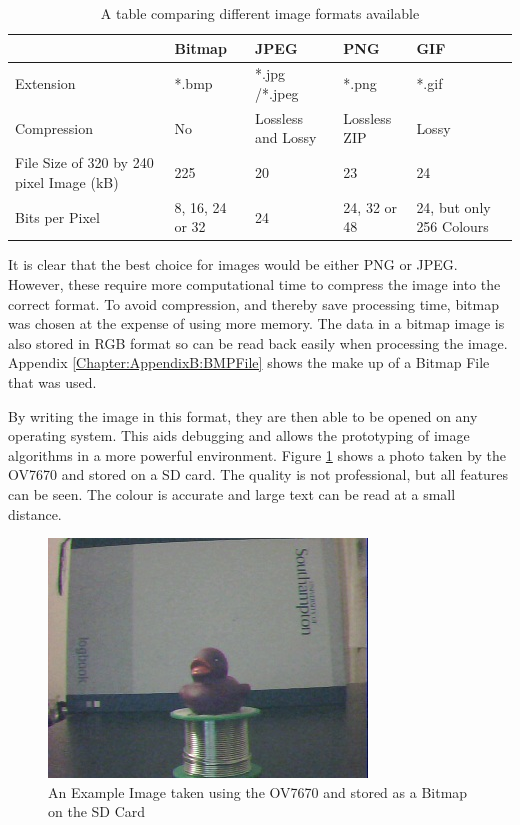 \begin{table}
\centering
\begin{tabular}{|p{3cm}| p{2cm}|p{2cm}|p{2cm}|p{2cm}|} \hline
			&	Bitmap 		& 	JPEG			 	&	PNG				& 	GIF \\ \hline
Extension 		& 	*.bmp 		&  	*.jpg /*.jpeg 		& 	*.png				& 	*.gif \\ \hline
Compression 	& 	No 			& 	Lossless  and Lossy		&	Lossless ZIP			&	Lossy	\\\hline
File Size of 320 by 
240 pixel Image (kB) &	225			&	20				&	23				&	24 \\\hline
Bits per Pixel		&	8, 16, 24 or 32	&	24				&	24, 32 or 48 			& 	24, but only 256 Colours \\


\hline
\end{tabular}
\caption{A table comparing different image formats available \citep{ImageComparison}}
\label{ImageFormats}
\end{table}

It is clear that the best choice for images would be either PNG or JPEG. However, these require more computational time to compress the image into the correct format. To avoid compression, and thereby save processing time, bitmap was chosen at the expense of using more memory. The data in a bitmap image is also stored in RGB format so can be read back easily when processing the image. Appendix \ref{Chapter:AppendixB:BMPFile} shows the make up of a Bitmap File that was used.

By writing the image in this format, they are then able to be opened on any operating system. This aids debugging and allows the prototyping of image algorithms in a more powerful environment. Figure \ref{ExampleImage} shows a photo taken by the OV7670 and stored on a SD card. The quality is not professional, but all features can be seen. The colour is accurate and large text can be read at a small distance.

\begin{figure}
\begin{center}
\includegraphics{Figures/ExampleImageFromCamera.jpg} 
\end{center}
\caption{An Example Image taken using the OV7670 and stored as a Bitmap on the SD Card}
\label{ExampleImage}
\end{figure}

